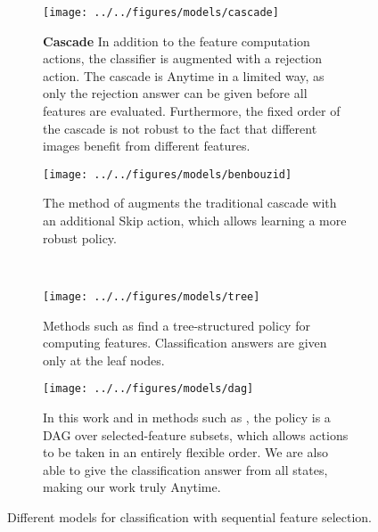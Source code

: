 \begin{figure}[h!]
\centering
\begin{subfigure}[b]{0.48\linewidth}
    \texttt{[image: ../../figures/models/cascade]}
    \caption{
\textbf{Cascade}
In addition to the feature computation actions, the classifier is augmented with a rejection action.
The cascade is Anytime in a limited way, as only the rejection answer can be given before all features are evaluated.
Furthermore, the fixed order of the cascade is not robust to the fact that different images benefit from different features.
}
\end{subfigure}\hfill%
\begin{subfigure}[b]{0.48\linewidth}
    \texttt{[image: ../../figures/models/benbouzid]}
    \caption{
The method of \cite{Benbouzid-ICML-2012} augments the traditional cascade with an additional Skip action, which allows learning a more robust policy.
}
\end{subfigure}\\
\begin{subfigure}[b]{0.48\linewidth}
    \texttt{[image: ../../figures/models/tree]}
    \caption{
Methods such as \cite{Xu-ICML-2012} find a tree-structured policy for computing features.
Classification answers are given only at the leaf nodes.
    }
\end{subfigure}\hfill%
\begin{subfigure}[b]{0.48\linewidth}
    \texttt{[image: ../../figures/models/dag]}
    \caption{
In this work and in methods such as \cite{Gao-NIPS-2011}, the policy is a DAG over selected-feature subsets, which allows actions to be taken in an entirely flexible order.
We are also able to give the classification answer from all states, making our work truly Anytime.
    }
\end{subfigure}
\caption{
Different models for classification with sequential feature selection.
}\label{fig:models}
\end{figure}
